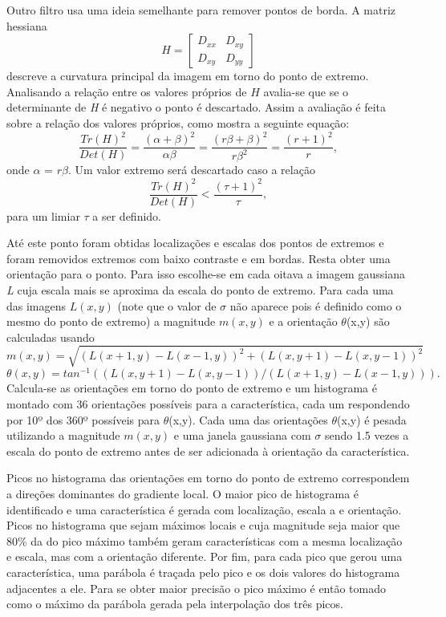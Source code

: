 Outro filtro usa uma ideia semelhante para remover pontos de borda. A matriz hessiana \[ \textit{H} = \left[ \begin{array}{cc}
D_{xx} & D_{xy} \\ 
D_{xy} & D_{yy}
\end{array} \right]  \] descreve a curvatura principal da imagem em torno do ponto de extremo. Analisando a relação entre os valores próprios de $\textit{H}$ avalia-se que se o determinante de \textit{H} é negativo o ponto é descartado. Assim a avaliação é feita sobre a relação dos valores próprios, como mostra a seguinte equação: \begin{equation}\label{equacaoseg}
\frac{\textit{Tr}(H)^2}{\textit{Det}(H)} = \frac{(\alpha + \beta)^2}{\alpha\beta} = \frac{(r\beta + \beta)^2}{r\beta^2} = \frac{(r + 1)^2}{r}, 
\end{equation} 
onde $\alpha$ = $r\beta$. Um valor extremo será descartado caso a relação \[ \frac{\textit{Tr}(H)^2}{\textit{Det}(H)} < \frac{(\tau + 1)^2}{\tau}, \] para um limiar $\tau$ a ser definido.  

Até este ponto foram obtidas localizações e escalas dos pontos de extremos e foram removidos extremos com baixo contraste e em bordas. Resta obter uma orientação para o ponto. Para isso escolhe-se em cada oitava a imagem gaussiana \textit{L} cuja escala mais se aproxima da escala do ponto de extremo. Para cada uma das imagens $\textit{L}(x,y)$  (note que o valor de $\sigma$ não aparece pois é definido como o mesmo do ponto de extremo) a magnitude $\textit{m}(x,y)$ e a orientação $\theta$(x,y) são calculadas usando \[ \textit{m}(x,y) = \sqrt{(\textit{L}(x  +1,y) - \textit{L}(x - 1,y))^2 + (\textit{L}(x,y + 1) - \textit{L}(x,y - 1))^2} \] \[ \theta (x,y) = \textit{tan}^{-1}((\textit{L}(x,y +1) - \textit{L}(x,y - 1))/(\textit{L}(x + 1,y) - \textit{L}(x - 1,y))).\]
Calcula-se as orientações em torno do ponto de extremo e um histograma é montado com 36 orientações possíveis para a característica, cada um respondendo por 10º dos 360º possíveis para $\theta$(x,y). Cada uma das orientações $\theta$(x,y) é pesada utilizando a magnitude $\textit{m}(x,y)$ e uma janela gaussiana com $\sigma$ sendo 1.5 vezes a escala do ponto de extremo antes de ser adicionada à orientação da característica.

Picos no histograma das orientações em torno do ponto de extremo correspondem a direções dominantes do gradiente local. O maior pico de histograma é identificado e uma característica é gerada com localização, escala a e orientação. Picos no histograma que sejam máximos locais e cuja magnitude seja maior que 80\% da do pico máximo também geram características com a mesma localização e escala, mas com a orientação diferente. Por fim, para cada pico que gerou uma característica, uma parábola é traçada pelo pico e os dois valores do histograma adjacentes a ele. Para se obter maior precisão o pico máximo é então tomado como o máximo da parábola gerada pela interpolação dos três picos.


